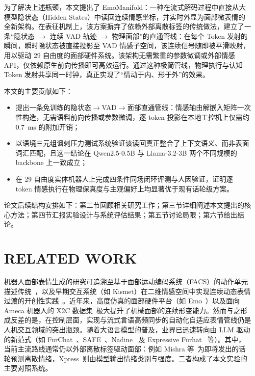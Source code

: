 \documentclass[letterpaper, 10 pt, conference]{ieeeconf/ieeeconf}
\begin{document}
为了解决上述瓶颈，本文提出了 EmoManifold：一种在流式解码过程中直接从大模型隐状态（Hidden States）中读回连续情感坐标，并实时外显为面部微表情的全新架构。在表征机制上，该方案摒弃了依赖外部离散标签的传统做法，建立了一条“隐状态 $\rightarrow$ 连续 VAD 轨迹 $\rightarrow$ 物理面部”的直通管线：在每个 Token 发射的瞬间，瞬时隐状态被直接投影至 VAD 情感子空间，该连续信号随即被平滑映射，用以驱动 29 自由度的面部硬件系统。该架构无需繁重的参数微调或外部情感 API，仅依赖原生前向传播即可高效运行。通过这种极简管线，物理执行与认知 Token 发射共享同一时钟，真正实现了“情动于内、形于外”的效果。

本文的主要贡献如下：
\begin{itemize}
\item 提出一条免训练的隐状态$\rightarrow$VAD$\rightarrow$面部直通管线：情感轴由解嵌入矩阵一次性构造，无需语料前向传播或参数微调，逐 token 投影在本地工控机上仅需约 $0.7$~ms 的附加开销；
\item 以语境三元组讽刺压力测试系统验证该读回真正整合了上下文语义、而非表面词汇匹配，且这一结论在 Qwen2.5-0.5B 与 Llama-3.2-3B 两个不同规模的 backbone 上一致成立；
\item 在 29 自由度实体机器人上完成四条件同场闭环评测与人因验证，证明逐 token 情感执行在物理保真度与主观偏好上均显著优于现有话轮级方案。
\end{itemize}
论文后续结构安排如下：第二节回顾相关研究工作；第三节详细阐述本文提出的核心方法；第四节汇报实验设计与系统评估结果；第五节讨论局限；第六节给出结论。

\section{RELATED WORK}
\label{sec:related}

机器人面部表情生成的研究可追溯至基于面部运动编码系统（FACS）的动作单元描述传统~\cite{ekman1978facs}，以及早期交互系统（如 Kismet）在二维情感空间中实现连续动态表情过渡的开创性实践~\cite{breazeal2002designing}。近年来，高度仿真的面部硬件平台（如 Emo~\cite{hu2024emo}）以及面向 Ameca 机器人的 X2C 数据集~\cite{li2025x2c}极大提升了机械面部的连续形变能力。然而与之形成反差的是，在控制层面，实现与流式言语高频同步的自动化自适应表情管线仍是人机交互领域的突出瓶颈。随着大语言模型的普及，业界已迅速转向由 LLM 驱动的新范式（如 FurChat~\cite{cherakara2023furchat}、SAFE~\cite{lee2023safe}、Nadine~\cite{kang2024nadine} 及 Expressive Furhat~\cite{abbo2025expressive} 等）。其中，当前主流路线通常仍以外部离散标签驱动面部：例如 Mishra 等~\cite{mishra2023realtime}为即将发出的话轮预测离散情绪，Xpress~\cite{antony2025xpress}则由模型输出情绪类别与强度。二者构成了本文实验的主要对照系统。
\end{document}
